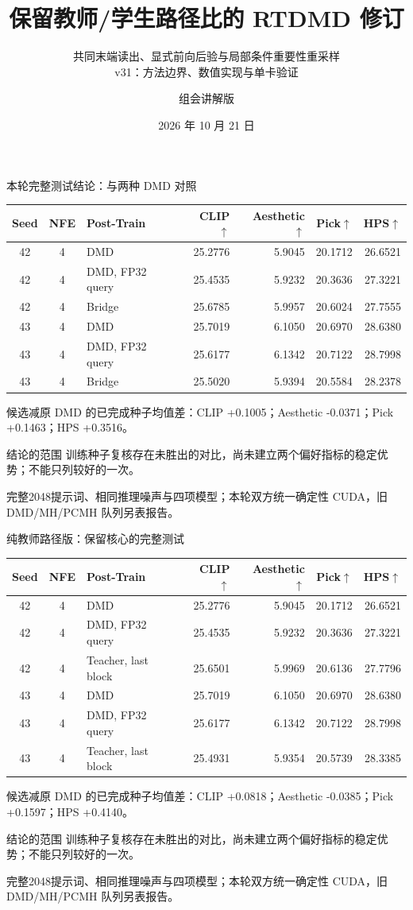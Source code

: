 \documentclass[10pt,aspectratio=169]{beamer}
\title[保留路径比的 RTDMD]{保留教师/学生路径比的 RTDMD 修订}
\subtitle{共同末端读出、显式前向后验与局部条件重要性重采样\\v31：方法边界、数值实现与单卡验证}
\author{组会讲解版}
\date{2026 年 10 月 21 日}
\begin{document}
\maketitle
\begin{frame}{本轮完整测试结论：与两种 DMD 对照}
\scriptsize\centering
\begin{tabular}{cclrrrr}\toprule
Seed & NFE & Post-Train & CLIP$\uparrow$ & Aesthetic$\uparrow$ & Pick$\uparrow$ & HPS$\uparrow$\\\midrule
42 & 4 & DMD & 25.2776 & 5.9045 & 20.1712 & 26.6521 \\
42 & 4 & DMD, FP32 query & 25.4535 & 5.9232 & 20.3636 & 27.3221 \\
42 & 4 & Bridge & 25.6785 & 5.9957 & 20.6024 & 27.7555 \\
43 & 4 & DMD & 25.7019 & 6.1050 & 20.6970 & 28.6380 \\
43 & 4 & DMD, FP32 query & 25.6177 & 6.1342 & 20.7122 & 28.7998 \\
43 & 4 & Bridge & 25.5020 & 5.9394 & 20.5584 & 28.2378 \\
\bottomrule\end{tabular}\par\raggedright\vspace{5pt}
候选减原 DMD 的已完成种子均值差：CLIP +0.1005；Aesthetic -0.0371；Pick +0.1463；HPS +0.3516。
\begin{alertblock}{结论的范围}
训练种子复核存在未胜出的对比，尚未建立两个偏好指标的稳定优势；不能只列较好的一次。
\end{alertblock}
完整2048提示词、相同推理噪声与四项模型；本轮双方统一确定性 CUDA，旧 DMD/MH/PCMH 队列另表报告。
\end{frame}
\begin{frame}{纯教师路径版：保留核心的完整测试}
\scriptsize\centering
\begin{tabular}{cclrrrr}\toprule
Seed & NFE & Post-Train & CLIP$\uparrow$ & Aesthetic$\uparrow$ & Pick$\uparrow$ & HPS$\uparrow$\\\midrule
42 & 4 & DMD & 25.2776 & 5.9045 & 20.1712 & 26.6521 \\
42 & 4 & DMD, FP32 query & 25.4535 & 5.9232 & 20.3636 & 27.3221 \\
42 & 4 & Teacher, last block & 25.6501 & 5.9969 & 20.6136 & 27.7796 \\
43 & 4 & DMD & 25.7019 & 6.1050 & 20.6970 & 28.6380 \\
43 & 4 & DMD, FP32 query & 25.6177 & 6.1342 & 20.7122 & 28.7998 \\
43 & 4 & Teacher, last block & 25.4931 & 5.9354 & 20.5739 & 28.3385 \\
\bottomrule\end{tabular}\par\raggedright\vspace{5pt}
候选减原 DMD 的已完成种子均值差：CLIP +0.0818；Aesthetic -0.0385；Pick +0.1597；HPS +0.4140。
\begin{alertblock}{结论的范围}
训练种子复核存在未胜出的对比，尚未建立两个偏好指标的稳定优势；不能只列较好的一次。
\end{alertblock}
完整2048提示词、相同推理噪声与四项模型；本轮双方统一确定性 CUDA，旧 DMD/MH/PCMH 队列另表报告。
\end{frame}
\end{document}
